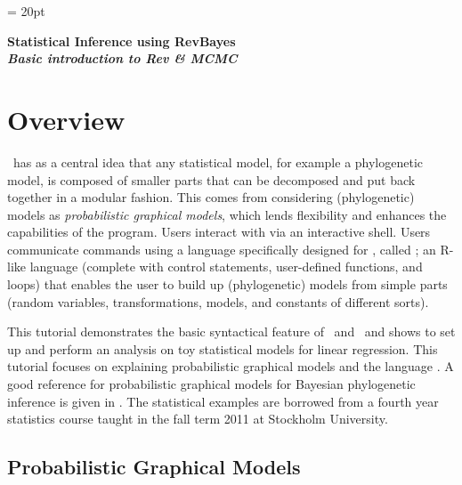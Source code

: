\documentclass[11pt]{article}
\begin{document}
\renewcommand{\headrulewidth}{0.5pt}
\headsep = 20pt
\lhead{ }

\thispagestyle{plain}
\begin{center}

\textbf{\LARGE Statistical Inference using RevBayes}\\\vspace{2mm}
\textbf{\it{\Large Basic introduction to Rev \& MCMC}}\\\vspace{2mm}
\end{center}

\section*{Overview}

\RevBayes~has as a central idea that any statistical model, for example a phylogenetic model, is composed of smaller parts that can be decomposed and put back together in a modular fashion. This comes from considering (phylogenetic) models as \textit{probabilistic graphical models}, which lends flexibility and enhances the capabilities of the program. 
Users interact with \RevBayes via an interactive shell.
Users communicate commands using a language specifically designed for \RevBayes, called \Rev; an R-like language (complete with control statements, user-defined functions, and loops) that enables the user to build up (phylogenetic) models from simple parts (random variables, transformations, models, and constants of different sorts).
 

This tutorial demonstrates the basic syntactical feature of \RevBayes~and \Rev~and shows to set up and perform an analysis on toy statistical models for linear regression. 
This tutorial focuses on explaining probabilistic graphical models and the language \Rev.
A good reference for probabilistic graphical models for Bayesian phylogenetic inference is given in  \citep{hoehnaGM2014}.
The statistical examples are borrowed from a fourth year statistics course taught in the fall term 2011 at Stockholm University.


\bigskip
\subsection*{Probabilistic Graphical Models}
\end{document}

